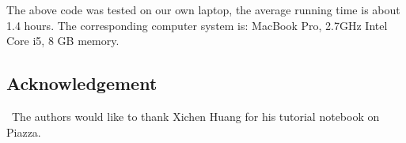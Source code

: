 \documentclass[12pt]{article}
\begin{document}
The above code was tested on our own laptop, the average running time is about 1.4 hours. The corresponding computer system is:
MacBook Pro, 2.7GHz Intel Core i5, 8 GB memory.  

\subsection*{Acknowledgement}


\quad\ The authors would like to thank Xichen Huang for his tutorial notebook on Piazza.

\vfill\pagebreak

%
\end{document}
